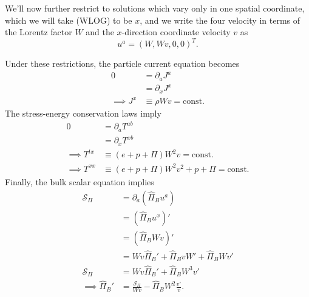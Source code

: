 \documentclass[12pt]{article}
\numberwithin{equation}{section}
\begin{document}
We'll now further restrict to solutions which vary only in one spatial coordinate, which we will take (WLOG) to be $x$, and we write the four velocity in terms of the Lorentz factor $W$ and the $x$-direction coordinate velocity $v$ as
\begin{equation}
u^a = (W, W v, 0, 0)^T.
\end{equation}

Under these restrictions, the particle current equation becomes
\begin{equation} \label{eq:J_eqn}
\begin{aligned}
0 &= \partial_a J^{a} \\
&= \partial_x J^x \\
\implies J^x &\equiv \rho W v = \mathrm{const.}
\end{aligned}
\end{equation}
The stress-energy conservation laws imply
\begin{equation} \label{eq:T_eqns}
\begin{aligned}
0 &= \partial_a T^{ab} \\
&= \partial_x T^{xb} \\
\implies T^{tx} &\equiv (e + p + \Pi) W^2 v = \mathrm{const.} \\
\implies T^{xx} &\equiv (e + p + \Pi) W^2 v^2 + p + \Pi = \mathrm{const.}
\end{aligned}
\end{equation}
Finally, the bulk scalar equation implies
\begin{equation} \label{eq:intermediate_Pi_ODE}
\begin{aligned}
\mathcal{S}_\Pi &= \partial_a (\hat{\Pi}_B u^a) \\
&= (\hat{\Pi}_B u^x)' \\
&= (\hat{\Pi}_B W v)' \\
&= W v \hat{\Pi}_B' + \hat{\Pi}_B v W' + \hat{\Pi}_B W  v' \\
\mathcal{S}_\Pi &= W v \hat{\Pi}_B' + \hat{\Pi}_B W^3 v' \\
\implies \hat{\Pi}_B' &= \frac{\mathcal{S}_\Pi}{W v} - \hat{\Pi}_B W^2 \frac{v'}{v}. \\
\end{aligned}
\end{equation}
\end{document}
